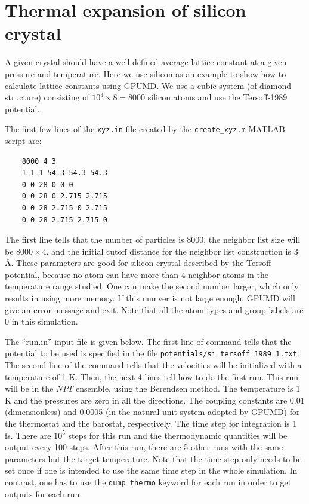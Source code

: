 \documentclass[12pt,a4paper]{report}
\begin{document}
\section{Thermal expansion of silicon crystal}


A given crystal should have a well defined average lattice constant at a given pressure and temperature. Here we use silicon as an example to show how to calculate lattice constants using GPUMD. We use a cubic system (of diamond structure) consisting of $10^3\times 8 = 8000$ silicon atoms and use the Tersoff-1989 potential.

The first few lines of the \verb"xyz.in" file created by the \verb"create_xyz.m" MATLAB script are:
\begin{verbatim}
    8000 4 3
    1 1 1 54.3 54.3 54.3
    0 0 28 0 0 0
    0 0 28 0 2.715 2.715
    0 0 28 2.715 0 2.715
    0 0 28 2.715 2.715 0
\end{verbatim}
The first line tells that the number of particles is 8000, the neighbor list size will be
$8000\times 4$, and the initial cutoff distance for the neighbor list construction is 3 \AA.
These parameters are good for silicon crystal described by the Tersoff potential, because no atom can have more than 4 neighbor atoms in the temperature range studied. One can make the second number larger, which only results in using more memory. If this numver is not large enough, GPUMD will give an error message and exit. Note that all the atom types and group labels are 0 in this simulation.

The ``run.in'' input file is given below. The first line of command tells that the potential to be used is specified in the file \verb"potentials/si_tersoff_1989_1.txt".  The second line of the command tells that the velocities will be initialized with a temperature of 1 K. Then, the next 4 lines tell how to do the first run. This run will be in the $NPT$ ensemble, using the Berendsen method. The temperature is 1 K and the pressures are zero in all the directions. The coupling constants are 0.01 (dimensionless) and 0.0005 (in the natural unit system adopted by GPUMD) for the thermostat and the barostat, respectively. The time step for integration is 1 fs. There are $10^5$ steps for this run and the thermodynamic quantities will be output every 100 steps. After this run, there are 5 other runs with the same parameters but the target temperature. Note that the time step only needs to be set once if one is intended to use the same time step in the whole simulation. In contrast, one has to use the \verb"dump_thermo" keyword for each run in order to get outputs for each run.
\end{document}
